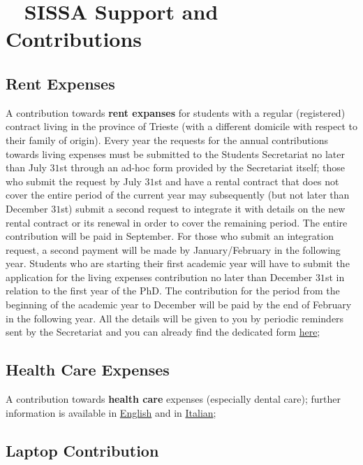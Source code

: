 \documentclass{sissavademecum}
\begin{document}
\chapter{\texorpdfstring{\faHandHoldingUsd\ }{} SISSA Support and Contributions}


\section{Rent Expenses}

A contribution towards \textbf{rent expanses} for students with a regular (registered) contract living in the province of Trieste (with a different domicile with respect to their family of origin). Every year the requests for the annual contributions towards living expenses must be submitted to the Students Secretariat no later than July $31$st through an ad-hoc form provided by the Secretariat itself; those who submit the request by July $31$st and have a rental contract that does not cover the entire period of the current year may subsequently (but not later than December $31$st) submit a second request to integrate it with details on the new rental contract or its renewal in order to cover the remaining period. The entire contribution will be paid in September. For those who submit an integration request, a second payment will be made by January/February in the following year. Students who are starting their first academic year will have to submit the application for the living expenses contribution no later than December $31$st in relation to the first year of the PhD. The contribution for the period from the beginning of the academic year to December will be paid by the end of February in the following year. All the details will be given to you by periodic reminders sent by the Secretariat and you can already find the dedicated form \href{http://wiki.sissa.it/students/index.php/Contribution_towards_living_expenses}{here};
 

\section{Health Care Expenses}

A contribution towards \textbf{health care} expenses (especially dental care); further information is available in \href{https://www.sissa.it/_media/documenti/english_regolamento_interventi.pdf}{English} and in \href{https://www.sissa.it/_media/documenti/regolamento-assistenziale.pdf}{Italian};


\section{Laptop Contribution}
\end{document}
